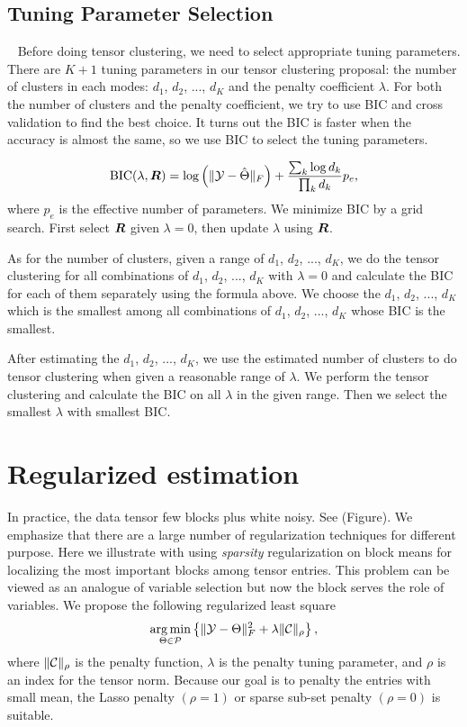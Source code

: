 \documentclass{article}
\begin{document}
\subsection{Tuning Parameter Selection}~\label{sec:tuning}
Before doing tensor clustering, we need to select appropriate tuning parameters. 
There are $K+1$ tuning parameters in our tensor clustering proposal: the number of clusters in each modes: $d_1$, $d_2$, ..., $d_K$ and the penalty coefficient $\lambda$. For both the number of clusters and the penalty coefficient, we try to use BIC and cross validation to find the best choice. It turns out the BIC is faster when the accuracy is almost the same, so we use BIC to select the tuning parameters. \par
\begin{equation*}
\text{BIC}(\lambda,\bm{R}) =  \log\left(\lVert\mathcal{Y}-\hat \Theta\rVert_F\right)+{ \sum_k \log d_k \over \prod_k d_k}p_e,
\end{equation*}
where $p_e$ is the effective number of parameters. We minimize BIC by a grid search. First select $\bm{R}$ given $\lambda=0$, then update $\lambda$ using $\bm{R}$. 

As for the number of clusters, given a range of $d_1$, $d_2$, ..., $d_K$, we do the tensor clustering for all combinations of $d_1$, $d_2$, ..., $d_K$ with $\lambda=0$ and calculate the BIC for each of them separately using the formula above. We choose the $d_1$, $d_2$, ..., $d_K$ which is the smallest among all combinations of $d_1$, $d_2$, ..., $d_K$ whose BIC is the smallest. \par

After estimating the $d_1$, $d_2$, ..., $d_K$, we use the estimated number of clusters to do tensor clustering when given a reasonable range of $\lambda$. We perform the tensor clustering and calculate the BIC on all $\lambda$ in the given range. Then we select the smallest $\lambda$ with smallest BIC.



\section{Regularized estimation}
In practice, the data tensor few blocks plus white noisy. See (Figure). We emphasize that there are a large number of regularization techniques for different purpose. Here we illustrate with using \emph{sparsity} regularization on block means for localizing the most important blocks among tensor entries. This problem can be viewed as an analogue of variable selection but now the block serves the role of variables. We propose the following regularized least square 
\[
\operatorname*{arg\,min}_{\Theta\in \mathcal{P}}\left\{\lVert\mathcal{Y}-\Theta\rVert_F^2+\lambda \lVert\mathcal{C}\rVert_\rho
\right\},
\]
where $\lVert\mathcal{C}\rVert_\rho$ is the penalty function, $\lambda$ is the penalty tuning parameter, and $\rho$ is an index for the tensor norm. Because our goal is to penalty the entries with small mean, the Lasso penalty $(\rho=1)$ or sparse sub-set penalty $(\rho=0)$ is suitable. 
\end{document}
